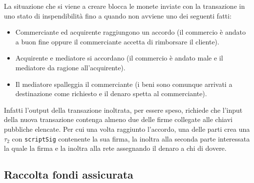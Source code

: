 La situazione che si viene a creare blocca le monete inviate con la transazione in uno stato di inspendibilità fino a quando non avviene uno dei seguenti fatti:
\begin{itemize}
    \item Commerciante ed acquirente raggiungono un accordo (il commercio è andato a buon fine oppure il commerciante accetta di rimborsare il cliente).
    \item Acquirente e mediatore si accordano (il commercio è andato male e il mediatore da ragione all'acquirente).
    \item Il mediatore spalleggia il commerciante (i beni sono comunque arrivati a destinazione come richiesto e il denaro spetta al commerciante).
\end{itemize}
Infatti l'output della transazione inoltrata, per essere speso, richiede che l'input della nuova transazione contenga almeno due delle firme collegate alle chiavi pubbliche elencate. Per cui una volta raggiunto l'accordo, una delle parti crea una $\tau_2$ con \verb|scriptSig| contenente la sua firma, la inoltra alla seconda parte interessata la quale la firma e la inoltra alla rete assegnando il denaro a chi di dovere.

\subsection{Raccolta fondi assicurata}

